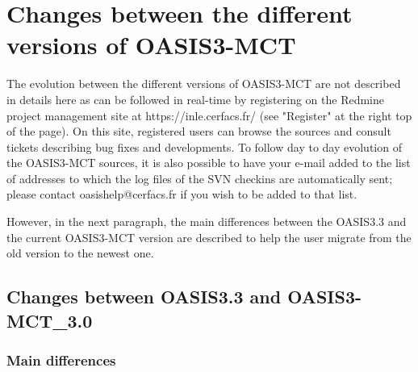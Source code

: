 \newpage

\chapter{Changes between the different versions of OASIS3-MCT}
\label{sec_changes}

The evolution between the different versions of OASIS3-MCT are not
described in details here as can be
followed in real-time by registering on the Redmine project management
site at https://inle.cerfacs.fr/ (see "Register" at the right top of
the page). On this site, registered users can browse the sources and
consult tickets describing bug fixes and developments. To follow day
to day evolution of the OASIS3-MCT sources, it is also possible to
have your e-mail added to the list of addresses to which the log files
of the SVN checkins are automatically sent; please contact
oasishelp@cerfacs.fr if you wish to be added to that list.

However, in the next paragraph, the main differences between the
OASIS3.3 and the current OASIS3-MCT version are described to help the
user migrate from the old version to the newest one.

\section{Changes between OASIS3.3 and OASIS3-MCT\_3.0}
\label{sec_oa2_oa3}

\subsection {Main differences}

